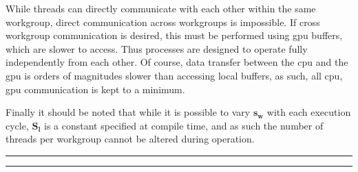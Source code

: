             While threads can directly communicate with each other within the same workgroup, direct communication across workgroups is
            impossible. If cross workgroup communication is desired, this must be performed using \ac{gpu} buffers, which are slower to access. Thus processes are
            designed to operate fully independently from each other. Of course, data transfer between the \ac{cpu} and the \ac{gpu} is orders of magnitudes
            slower than accessing local buffers, as such, all \ac{cpu}, \ac{gpu} communication is kept to a minimum.
            
            Finally it should be noted that while it is possible to vary \(\bm{s_w}\) with each execution cycle, \(\bm{S_l}\) is a constant specified at compile time,
            and as such the number of threads per workgroup cannot be altered during operation.
        
    \bigskip
    \bigskip
    \hrule
    \smallbreak
    \hrule
